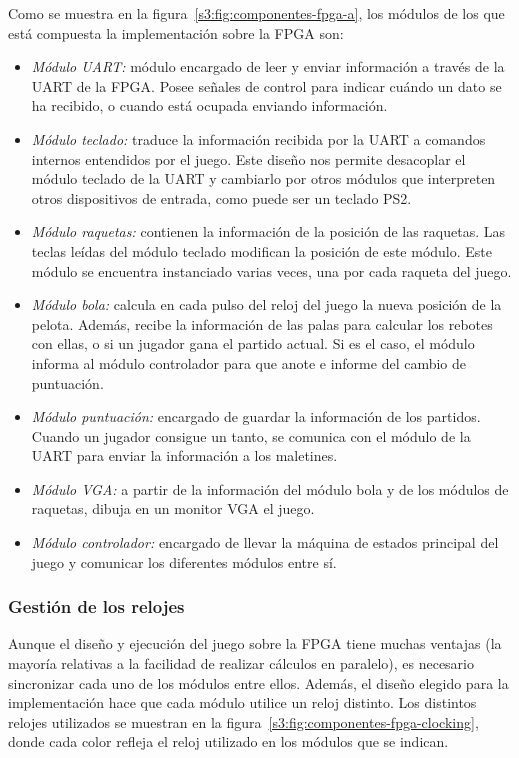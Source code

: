 Como se muestra en la figura~\ref{s3:fig:componentes-fpga-a}, los módulos de los que está compuesta la
implementación sobre la FPGA son:
\begin{itemize}
\item \emph{Módulo UART:} módulo encargado de leer y enviar información a
  través de la UART de la FPGA. Posee señales de control para indicar
  cuándo un dato se ha recibido, o cuando está ocupada enviando
  información.
\item \emph{Módulo teclado:} traduce la información recibida por la UART a
  comandos internos entendidos por el juego. Este diseño nos permite
  desacoplar el módulo teclado de la UART y cambiarlo por otros módulos
  que interpreten otros dispositivos de entrada, como puede ser un teclado
  PS2.
\item \emph{Módulo raquetas:} contienen la información de la posición de
  las raquetas. Las teclas leídas del módulo teclado modifican la posición
  de este módulo. Este módulo se encuentra instanciado varias veces, una
  por cada raqueta del juego.
\item \emph{Módulo bola:} calcula en cada pulso del reloj del juego la
  nueva posición de la pelota. Además, recibe la información de las palas
  para calcular los rebotes con ellas, o si un jugador gana el partido
  actual. Si es el caso, el módulo informa al módulo controlador para que
  anote e informe del cambio de puntuación.
\item \emph{Módulo puntuación:} encargado de guardar la información de los
  partidos. Cuando un jugador consigue un tanto, se comunica con el módulo
  de la UART para enviar la información a los maletines.
\item \emph{Módulo VGA:} a partir de la información del módulo bola y de
  los módulos de raquetas, dibuja en un monitor VGA el juego.
\item \emph{Módulo controlador:} encargado de llevar la máquina de estados
  principal del juego y comunicar los diferentes módulos entre sí.
\end{itemize}

\subsubsection{Gestión de los relojes}
\label{s3:subsubsec:clocking}
Aunque el diseño y ejecución del juego sobre la FPGA tiene muchas ventajas
(la mayoría relativas a la facilidad de realizar cálculos en paralelo), es
necesario sincronizar cada uno de los módulos entre ellos. Además, el
diseño elegido para la implementación hace que cada módulo utilice un reloj
distinto. Los distintos relojes utilizados se muestran en la
figura~\ref{s3:fig:componentes-fpga-clocking}, donde cada color refleja el
reloj utilizado en los módulos que se indican.

